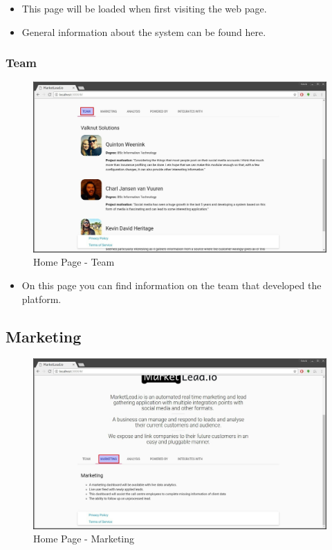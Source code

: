 \documentclass{article}
\begin{document}
			\begin{itemize}
				\item This page will be loaded when first visiting the web page.
				\item General information about the system can be found here.
			\end{itemize}

			\subsubsection{Team}
				\begin{figure}[H]
					\includegraphics[width=\textwidth]{images/home_team.jpg}
					\caption{Home Page - Team}
					\label{fig:homeTeam}
				\end{figure}

				\begin{itemize}
					\item On this page you can find information on the team that developed the platform.
				\end{itemize}

			\subsection{Marketing}
				\begin{figure}[H]
					\includegraphics[width=\textwidth]{images/home_marketing.jpg}
					\caption{Home Page - Marketing}
					\label{fig:homeMarketing}
				\end{figure}
\end{document}
